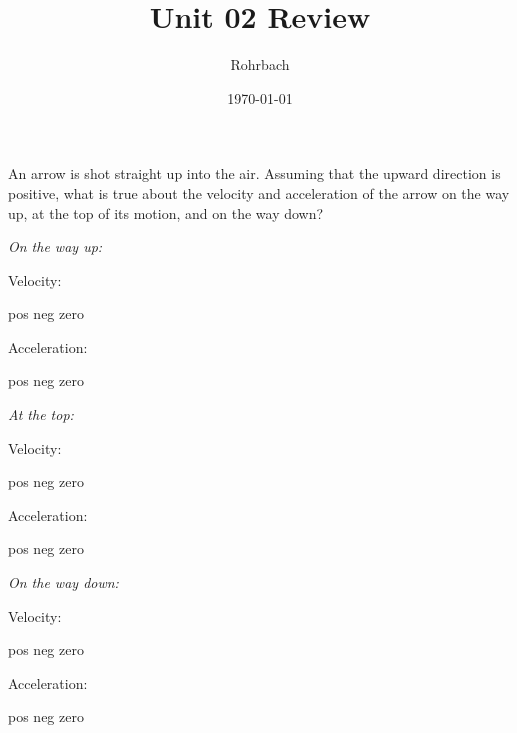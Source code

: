 \documentclass[10pt]{exam}
\title{Unit 02 Review}
\author{Rohrbach}
\date{\today}
\begin{document}
\maketitle

\printeqs

\begin{questions}
  \question 
    An arrow is shot straight up into the air.  Assuming that the upward direction is positive, what is true about the velocity and acceleration of the arrow on the way up, at the top of its motion, and on the way down?

    \begin{multicols}{3}
      {\it On the way up:}

      Velocity:
      
      \begin{oneparcheckboxes}
        \correctchoice pos
        \choice neg
        \choice zero
      \end{oneparcheckboxes}

      Acceleration:
      
      \begin{oneparcheckboxes}
        \choice pos
        \correctchoice neg
        \choice zero
      \end{oneparcheckboxes}

      {\it At the top:}

      Velocity:
      
      \begin{oneparcheckboxes}
        \choice pos
        \choice neg
        \correctchoice zero
      \end{oneparcheckboxes}

      Acceleration:
      
      \begin{oneparcheckboxes}
        \choice pos
        \correctchoice neg
        \choice zero
      \end{oneparcheckboxes}

      {\it On the way down:}

      Velocity:
      
      \begin{oneparcheckboxes}
        \choice pos
        \correctchoice neg
        \choice zero
      \end{oneparcheckboxes}

      Acceleration:
      
      \begin{oneparcheckboxes}
        \choice pos
        \correctchoice neg
        \choice zero
      \end{oneparcheckboxes}
      

\end{multicols}
\end{questions}
\end{document}

